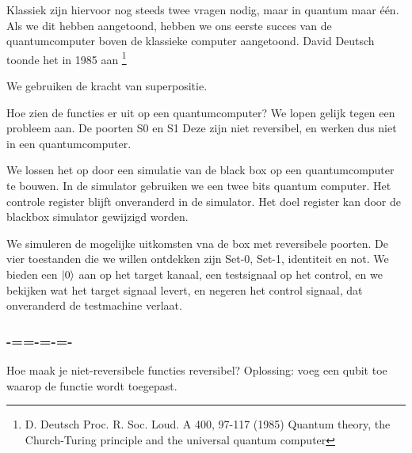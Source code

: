 \documentclass[../../main.tex]{subfiles}
\begin{document}
Klassiek zijn hiervoor nog steeds twee vragen nodig, maar in quantum maar \'e\'en. Als we dit hebben aangetoond, hebben we ons eerste succes van de quantumcomputer boven de klassieke computer aangetoond. David Deutsch toonde het in 1985 aan \footnote{D. Deutsch Proc. R. Soc. Loud. A 400, 97-117 (1985) Quantum theory, the Church-Turing principle and the universal quantum computer}

We gebruiken de kracht van superpositie.

Hoe zien de functies er uit op een quantumcomputer? We lopen gelijk tegen een probleem aan. De poorten S0 en S1 Deze zijn niet reversibel, en werken dus niet in een quantumcomputer.

We lossen het op door een simulatie van de black box op een quantumcomputer te bouwen. In de simulator gebruiken we een twee bits quantum computer. Het controle register blijft onveranderd in de simulator. Het doel register kan door de blackbox simulator gewijzigd worden.

We simuleren de mogelijke uitkomsten vna de box met reversibele poorten. De vier toestanden die we willen ontdekken zijn Set-0, Set-1, identiteit en not.
We bieden een $\ket{0}$ aan op het target kanaal, een testsignaal op het control, en we bekijken wat het target signaal levert, en negeren het control signaal, dat onveranderd de testmachine verlaat.

\subsubsection*{-==-=-=-}
Hoe maak je niet-reversibele functies reversibel?
Oplossing: voeg een qubit toe waarop de functie wordt toegepast.
\end{document}
